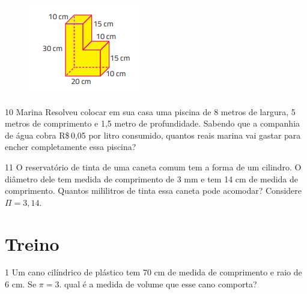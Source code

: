 \begin{figure}[H]
\centering\includegraphics[width=1.92708in,height=1.5625in]{./imgSAEB_8_MAT/media/image53.png}
\end{figure}







\num{10} Marina Resolveu colocar em sua casa uma piscina de 8 metros de
largura, 5 metros de comprimento e 1,5 metro de profundidade. Sabendo
que a companhia de água cobra R\$\,0,05 por litro consumido, quantos
reais marina vai gastar para encher completamente essa piscina?




\num{11} O reservatório de tinta de uma caneta comum tem a forma de um
cilindro. O diâmetro dele tem medida de comprimento de 3 mm e tem 14 cm
de medida de comprimento. Quantos mililitros de tinta essa caneta pode
acomodar? Considere $\Pi = 3,14$.





\section*{Treino}

\num{1} Um cano cilíndrico de plástico tem 70 cm de medida de comprimento e
raio de 6 cm. Se $\pi = 3$. qual é a medida de volume que esse cano comporta?


